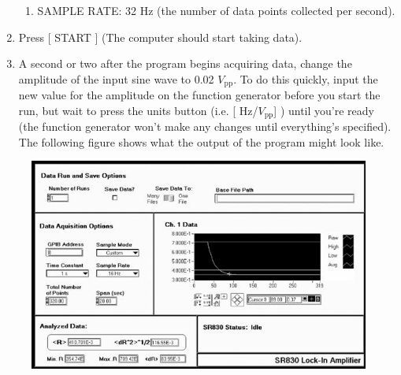 \documentclass{../lab}
\begin{document}
\begin{enumerate}
\begin{enumerate}
        \item SAMPLE RATE: 32 Hz (the number of data points collected per second).

    \end{enumerate}

    \item Press [ START ] (The computer should start taking data).

    \item A second or two after the program begins acquiring data, change the amplitude of the input sine wave to 0.02 $V_\text{pp}$. To do this quickly, input the new value for the amplitude on the function generator before you start the run, but wait to press the units button (i.e. [ Hz/$V_\text{pp}$] ) until you're ready (the function generator won't make any changes until everything's specified). The following figure shows what the output of the program might look like.

\end{enumerate}


\begin{figure}[h]
    \centering
    \href{http://experimentationlab.berkeley.edu/sites/default/files/images/LLSimage013.jpg}{\includegraphics[width=0.5\linewidth]{images/LLSimage013.jpg}}
    \caption{}
    \label{fig:LLSimage013}
\end{figure}
\end{document}
